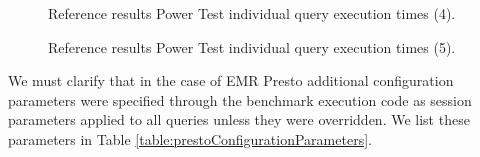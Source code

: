 \begin{figure}
   \begin{center}
   \end{center}
   \caption{Reference results Power Test individual query execution times (4).}
   \label{fig:referenceResultsDataLoadingIndTimes4}
\end{figure}

\begin{figure}
   \begin{center}
   \end{center}
   \caption{Reference results Power Test individual query execution times (5).}
   \label{fig:referenceResultsDataLoadingIndTimes5}
\end{figure}

We must clarify that in the case of EMR Presto additional configuration parameters were specified through the benchmark execution code as session parameters applied to all queries unless they were overridden. We list these parameters in Table \ref{table:prestoConfigurationParameters}.

